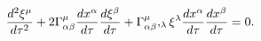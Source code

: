 \begin{equation}
\frac{d^{2}\xi ^{\mu }}{d\tau ^{2}}+2\Gamma _{\alpha \beta }^{\mu }\frac{%
dx^{\alpha }}{d\tau }\frac{d\xi ^{\beta }}{d\tau }+\Gamma _{\alpha \beta
}^{\mu },_{\lambda }\xi ^{\lambda }\frac{dx^{\alpha }}{d\tau }\frac{%
dx^{\beta }}{d\tau }=0.  \label{7}
\end{equation}

